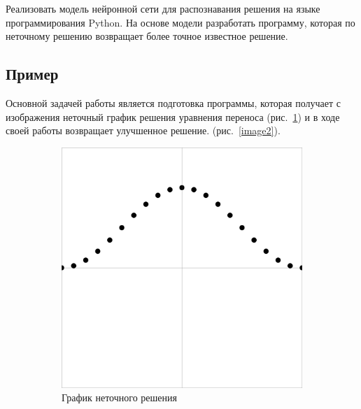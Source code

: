 \documentclass[12pt, a4paper]{article}
\begin{document}
Реализовать модель нейронной сети для распознавания решения на языке программирования Python. На основе модели разработать программу, которая по неточному решению возвращает более точное известное решение.

\clearpage
\subsection{Пример}
Основной задачей работы является подготовка программы, которая получает с изображения неточный график решения уравнения переноса (рис.~\ref{image1}) и в ходе своей работы возвращает улучшенное решение.   (рис.~\ref{image2}).

\begin{figure}[h]
	\begin{subfigure}[b]{0.45\textwidth}
		\includegraphics[width=\textwidth]{primer1_1}
		\caption{График неточного решения}
		\label{image1}
	\end{subfigure}
	\hfill
	\begin{subfigure}[b]{0.45\textwidth}

\end{subfigure}
\end{figure}
\end{document}

